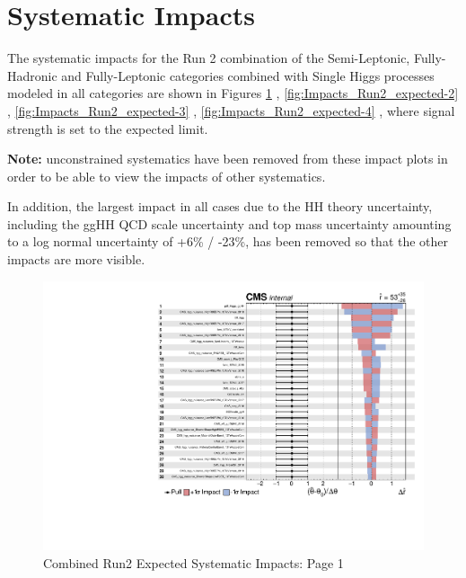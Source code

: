 \section{Systematic Impacts}
\label{sec:Impacts}

The systematic impacts for the Run 2 combination of the Semi-Leptonic, Fully-Hadronic and Fully-Leptonic categories combined
with Single Higgs processes modeled in all categories are shown in Figures \ref{fig:Impacts_Run2_expected-1} , \ref{fig:Impacts_Run2_expected-2} , \ref{fig:Impacts_Run2_expected-3} , \ref{fig:Impacts_Run2_expected-4} , where signal strength is set to the expected limit.    

\textbf{Note:} unconstrained systematics have been
removed from these impact plots in order to be able to view the impacts of other systematics. 

In addition, the largest impact in all cases due to the HH theory uncertainty, 
including the ggHH QCD scale uncertainty and top mass uncertainty amounting to a log normal uncertainty of +6\% / -23\%, has been removed so that the other impacts are more visible. 

\begin{figure}[h!]
    \centering
    \includegraphics[page=1, width=\textwidth]{Sections/HHWWgg/images/Impacts/HHWWgg_Impacts_expected.pdf}
    \caption{Combined Run2 Expected Systematic Impacts: Page 1}
    \label{fig:Impacts_Run2_expected-1}
\end{figure}

